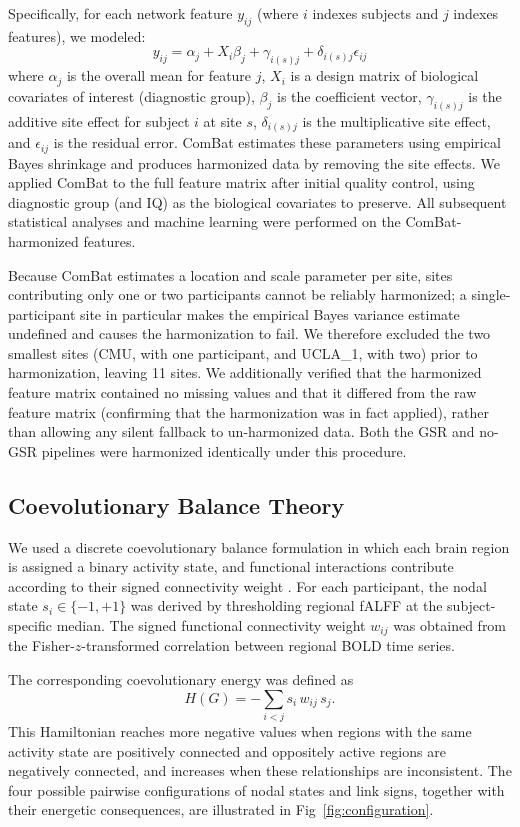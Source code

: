 \documentclass[10pt,letterpaper]{article}
\begin{document}
Specifically, for each network feature $y_{ij}$ (where $i$ indexes subjects and $j$ indexes
features), we modeled:
\[
y_{ij} = \alpha_j + X_i \beta_j + \gamma_{i(s)j} + \delta_{i(s)j} \epsilon_{ij}
\]
where $\alpha_j$ is the overall mean for feature $j$, $X_i$ is a design matrix of biological
covariates of interest (diagnostic group), $\beta_j$ is the coefficient vector, $\gamma_{i(s)j}$
is the additive site effect for subject $i$ at site $s$, $\delta_{i(s)j}$ is the multiplicative
site effect, and $\epsilon_{ij}$ is the residual error. ComBat estimates these parameters using
empirical Bayes shrinkage and produces harmonized data by removing the site effects. We applied
ComBat to the full feature matrix after initial quality control, using diagnostic group (and IQ) as
the biological covariates to preserve. All subsequent statistical analyses and machine learning were
performed on the ComBat-harmonized features.

Because ComBat estimates a location and scale parameter per site, sites contributing only one or two
participants cannot be reliably harmonized; a single-participant site in particular makes the
empirical Bayes variance estimate undefined and causes the harmonization to fail. We therefore
excluded the two smallest sites (CMU, with one participant, and UCLA\_1, with two) prior to
harmonization, leaving 11 sites. We additionally verified that the harmonized feature matrix
contained no missing values and that it differed from the raw feature matrix (confirming that the
harmonization was in fact applied), rather than allowing any silent fallback to un-harmonized data.
Both the GSR and no-GSR pipelines were harmonized identically under this procedure.

\subsection*{Coevolutionary Balance Theory}
We used a discrete coevolutionary balance formulation in which each brain region is assigned a
binary activity state, and functional interactions contribute according to their signed connectivity
weight \cite{Heider:1946ac,cartwright1956,Kargaran:2021he,GhanbarzadehNoudehi2022}. For each
participant, the nodal state $s_i \in \{-1,+1\}$ was derived by thresholding regional fALFF at
the subject-specific median. The signed functional connectivity weight $w_{ij}$ was obtained from
the Fisher-$z$-transformed correlation between regional BOLD time series.

The corresponding coevolutionary energy was defined as
\begin{equation}
H(G) = -\sum_{i<j} s_i \, w_{ij} \, s_j.
\label{eq:hamiltonian}
\end{equation}
This Hamiltonian reaches more negative values when regions with the same activity state are
positively connected and oppositely active regions are negatively connected, and increases when
these relationships are inconsistent. The four possible pairwise configurations of nodal states
and link signs, together with their energetic consequences, are illustrated in
Fig~\ref{fig:configuration}.
\end{document}
